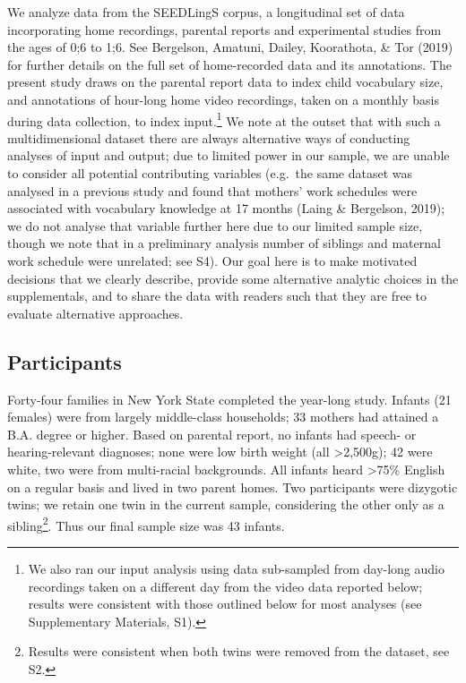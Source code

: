 \documentclass[
  man,mask,floatsintext]{apa6}
\begin{document}
We analyze data from the SEEDLingS corpus, a longitudinal set of data incorporating home recordings, parental reports and experimental studies from the ages of 0;6 to 1;6. See Bergelson, Amatuni, Dailey, Koorathota, \& Tor (2019) for further details on the full set of home-recorded data and its annotations. The present study draws on the parental report data to index child vocabulary size, and annotations of hour-long home video recordings, taken on a monthly basis during data collection, to index input.\footnote{We also ran our input analysis using data sub-sampled from day-long audio recordings taken on a different day from the video data reported below; results were consistent with those outlined below for most analyses (see Supplementary Materials, S1).} We note at the outset that with such a multidimensional dataset there are always alternative ways of conducting analyses of input and output; due to limited power in our sample, we are unable to consider all potential contributing variables (e.g.~the same dataset was analysed in a previous study and found that mothers' work schedules were associated with vocabulary knowledge at 17 months (Laing \& Bergelson, 2019); we do not analyse that variable further here due to our limited sample size, though we note that in a preliminary analysis number of siblings and maternal work schedule were unrelated; see S4). Our goal here is to make motivated decisions that we clearly describe, provide some alternative analytic choices in the supplementals, and to share the data with readers such that they are free to evaluate alternative approaches.

\hypertarget{participants}{%
\subsection{Participants}\label{participants}}

Forty-four families in New York State completed the year-long study. Infants (21 females) were from largely middle-class households; 33 mothers had attained a B.A. degree or higher. Based on parental report, no infants had speech- or hearing-relevant diagnoses; none were low birth weight (all \textgreater2,500g); 42 were white, two were from multi-racial backgrounds. All infants heard \textgreater75\% English on a regular basis and lived in two parent homes. Two participants were dizygotic twins; we retain one twin in the current sample, considering the other only as a sibling\footnote{Results were consistent when both twins were removed from the dataset, see S2.}. Thus our final sample size was 43 infants.
\end{document}
